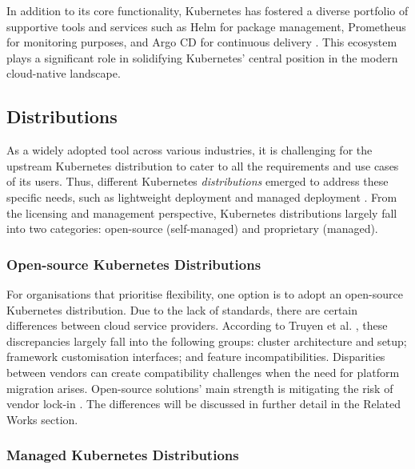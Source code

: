In addition to its core functionality, Kubernetes has fostered a diverse portfolio of supportive tools and services such as Helm for package management, Prometheus for monitoring purposes, and Argo CD for continuous delivery \cite{Helm, prometheusOverviewPrometheus, ArgoCDDeclarative}. This ecosystem plays a significant role in solidifying Kubernetes' central position in the modern cloud-native landscape.

\subsection{Distributions}
As a widely adopted tool across various industries, it is challenging for the upstream Kubernetes distribution to cater to all the requirements and use cases of its users. Thus, different Kubernetes \textit{distributions} emerged to address these specific needs, such as lightweight deployment and managed deployment \cite{bohmProfilingLightweightContainer2021, pereiraferreiraPerformanceEvaluationContainers2019}. From the licensing and management perspective, Kubernetes distributions largely fall into two categories: open-source (self-managed) and proprietary (managed).

\subsubsection{Open-source Kubernetes Distributions}

For organisations that prioritise flexibility, one option is to adopt an open-source Kubernetes distribution. Due to the lack of standards, there are certain differences between cloud service providers. According to Truyen et al. \cite{truyenManagingFeatureCompatibility2020}, these discrepancies largely fall into the following groups: cluster architecture and setup; framework customisation interfaces; and feature incompatibilities. Disparities between vendors can create compatibility challenges when the need for platform migration arises. Open-source solutions' main strength is mitigating the risk of vendor lock-in \cite{shaikh2011total}. The differences will be discussed in further detail in the Related Works section.

\subsubsection{Managed Kubernetes Distributions}


